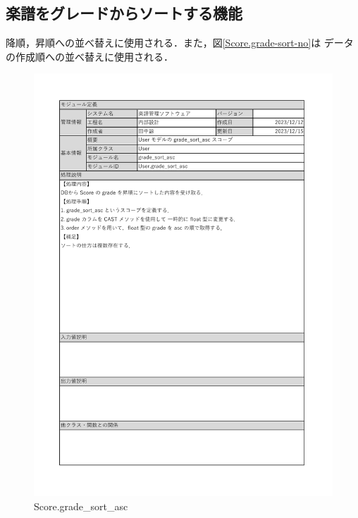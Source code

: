 \subsection*{楽譜をグレードからソートする機能}
降順，昇順への並べ替えに使用される．また，図\ref{Score.grade-sort-no}は
データの作成順への並べ替えに使用される．
\begin{figure}[H]
    \centering
    \includegraphics[scale=0.5]{img/Model/gradeSort_asc.pdf}
    \caption{Score.grade\_sort\_asc}
\end{figure}
